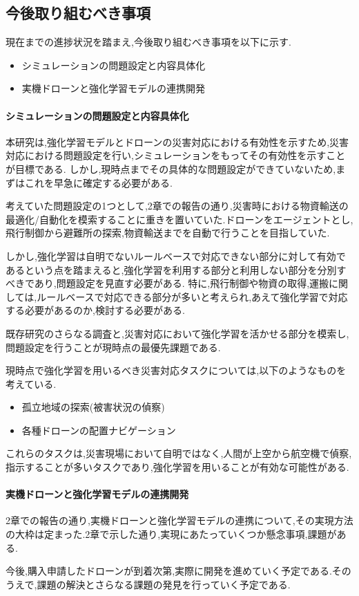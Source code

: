 \documentclass{article}[jsarticle]
\begin{document}
\subsection{今後取り組むべき事項}
現在までの進捗状況を踏まえ,今後取り組むべき事項を以下に示す.
\begin{itemize}
    \item シミュレーションの問題設定と内容具体化
    \item 実機ドローンと強化学習モデルの連携開発
\end{itemize}
\paragraph{シミュレーションの問題設定と内容具体化}
本研究は,強化学習モデルとドローンの災害対応における有効性を示すため,災害対応における問題設定を行い,シミュレーションをもってその有効性を示すことが目標である.
しかし,現時点までその具体的な問題設定ができていないため,まずはこれを早急に確定する必要がある.\par 
考えていた問題設定の1つとして,2章での報告の通り,災害時における物資輸送の最適化/自動化を模索することに重きを置いていた.ドローンをエージェントとし,飛行制御から避難所の探索,物資輸送までを自動で行うことを目指していた.\par
しかし,強化学習は自明でないルールベースで対応できない部分に対して有効であるという点を踏まえると,強化学習を利用する部分と利用しない部分を分別すべきであり,問題設定を見直す必要がある.
特に,飛行制御や物資の取得,運搬に関しては,ルールベースで対応できる部分が多いと考えられ,あえて強化学習で対応する必要があるのか,検討する必要がある.\par
既存研究のさらなる調査と,災害対応において強化学習を活かせる部分を模索し,問題設定を行うことが現時点の最優先課題である.\par
現時点で強化学習を用いるべき災害対応タスクについては,以下のようなものを考えている.
\begin{itemize}
    \item 孤立地域の探索(被害状況の偵察)
    \item 各種ドローンの配置ナビゲーション
\end{itemize}
これらのタスクは,災害現場において自明ではなく,人間が上空から航空機で偵察,指示することが多いタスクであり,強化学習を用いることが有効な可能性がある.\par
\paragraph{実機ドローンと強化学習モデルの連携開発}
2章での報告の通り,実機ドローンと強化学習モデルの連携について,その実現方法の大枠は定まった.2章で示した通り,実現にあたっていくつか懸念事項,課題がある.\par
今後,購入申請したドローンが到着次第,実際に開発を進めていく予定である.そのうえで,課題の解決とさらなる課題の発見を行っていく予定である.\par 
\end{document}
